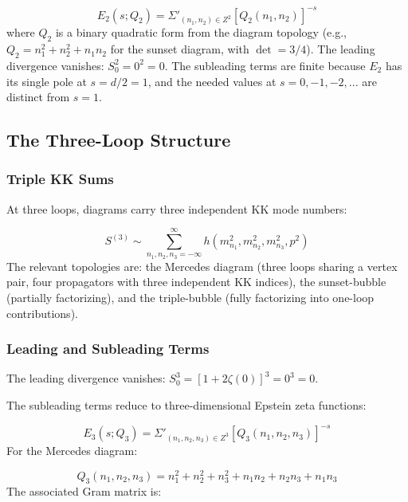 \documentclass[aps,prd,preprint,superscriptaddress,longbibliography,floatfix]{revtex4-2}
\theoremstyle{remark}
\begin{document}
\begin{equation}
    E_{2}(s; Q_{2}) = \Sigma'_{(n_{1},n_{2}) \in Z^{2}} [Q_{2}(n_{1},n_{2})]^{-s}
\end{equation}
where $Q_{2}$ is a binary quadratic form from the diagram topology (e.g., $Q_{2} = n_{1}^{2} + n_{2}^{2} + n_{1}n_{2}$ for the sunset diagram, with $\det = 3/4$). The leading divergence vanishes: $S_{0}^{2} = 0^{2} = 0$. The subleading terms are finite because $E_{2}$ has its single pole at $s = d/2 = 1$, and the needed values at $s = 0, -1, -2, ...$ are distinct from $s = 1$.



\subsection{The Three-Loop Structure}


\subsubsection{Triple KK Sums}

At three loops, diagrams carry three independent KK mode numbers:


\begin{equation}
    S^{(3)} \sim  \sum_{n_{1},n_{2},n_{3}=-\infty}^{\infty} h(m_{n_{1}}^{2}, m_{n_{2}}^{2}, m_{n_{3}}^{2}, p^{2})
\end{equation}
The relevant topologies are: the Mercedes diagram (three loops sharing a vertex pair, four propagators with three independent KK indices), the sunset-bubble (partially factorizing), and the triple-bubble (fully factorizing into one-loop contributions).


\subsubsection{Leading and Subleading Terms}

The leading divergence vanishes: $S_{0}^{3} = [1 + 2\zeta(0)]^{3} = 0^{3} = 0$.

The subleading terms reduce to three-dimensional Epstein zeta functions:


\begin{equation}
    E_{3}(s; Q_{3}) = \Sigma'_{(n_{1},n_{2},n_{3}) \in Z^{3}} [Q_{3}(n_{1},n_{2},n_{3})]^{-s}
\end{equation}
For the Mercedes diagram:


\begin{equation}
    Q_{3}(n_{1},n_{2},n_{3}) = n_{1}^{2} + n_{2}^{2} + n_{3}^{2} + n_{1}n_{2} + n_{2}n_{3} + n_{1}n_{3}
\end{equation}
The associated Gram matrix is:
\end{document}
